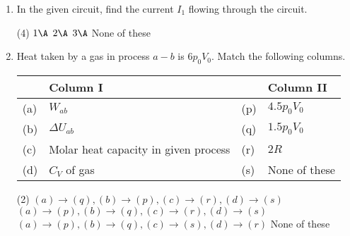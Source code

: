 \documentclass{article}
\renewcommand{\ans}{\quad}
\begin{document}
\begin{enumerate}
    \item In the given circuit, find the current $I_1$ flowing through the circuit.
        \begin{center}
        \end{center}
        \begin{tasks}(4)
            \task $1 \A$ 
            \task $2 \A$ \ans
            \task $3 \A$
            \task None of these
        \end{tasks}

    \item Heat taken by a gas in process \( a-b \) is \( 6p_0V_0 \). Match the following columns.
        \begin{center}
        \end{center}
        \begin{center}
            \renewcommand{\arraystretch}{1.5}
            \begin{table}[h]
                \centering
                \begin{tabular}{p{0.25cm}p{7cm}|p{0.25cm}p{4.5cm}}
                \hline
                & Column I & & Column II \\
                \hline
                (a) & \( W_{ab} \) & (p) & \( 4.5 p_0V_0 \) \\
                (b) & \( \Delta U_{ab} \) & (q) & \( 1.5 p_0V_0 \) \\
                (c) & Molar heat capacity in given process & (r) & \( 2R \) \\
                (d) & \( C_V \) of gas & (s) & None of these \\
                \hline
                \end{tabular}
            \end{table}
        \end{center}
        \begin{tasks}(2)
            \task $(a) \rightarrow (q), (b) \rightarrow (p), (c)\rightarrow (r), (d)\rightarrow (s)$ \ans
            \task $(a) \rightarrow (p), (b) \rightarrow (q), (c)\rightarrow (r), (d)\rightarrow (s)$
            \task $(a) \rightarrow (p), (b) \rightarrow (q), (c)\rightarrow (s), (d)\rightarrow (r)$
            \task None of these
        \end{tasks}



\end{enumerate}
\end{document}
